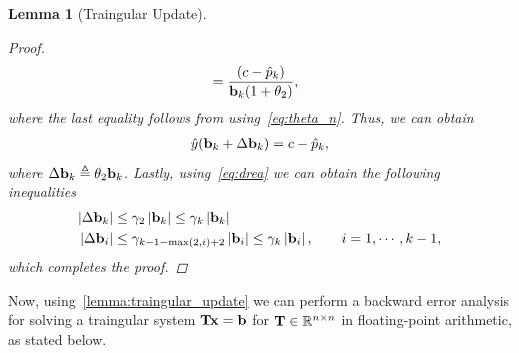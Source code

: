 \documentclass[11pt,draft]{article}
\newcommand{\define}{\ensuremath{\triangleq}}
\newcommand{\vect}[1]{\mathbf{\MakeLowercase{#1}}}
\newcommand{\mat}[1]{\mathbf{\MakeUppercase{#1}}}
\newcommand{\ireal}[1]{\in\mathbb{R}^{#1}}
\newtheorem{lemma}[theorem]{Lemma}
\theoremstyle{definition}
\theoremstyle{remark}
\newcommand{\abs}[1]{\left|#1\right|}
\begin{document}
\begin{lemma}[Traingular Update]
\begin{proof}
\begin{align}
    &=\frac{(c - \hat{p}_k)}{\vect{b}_k (1 + \theta_2)},
   \end{align}
   where the last equality follows from using~\cref{eq:theta_n}.
   Thus, we can obtain
   \begin{align}
    \hat{y}(\vect{b}_k + \Delta \vect{b}_k) = c - \hat{p}_k,
   \end{align}
   where $\Delta \vect{b}_k\define \theta_2 \vect{b}_k$.
   Lastly, using~\cref{eq:drea} we can obtain the following inequalities
   \begin{align}
    \abs{\Delta \vect{b}_k}  &\leq \gamma_2 \abs{\vect{b}_k} \leq \gamma_k\abs{\vect{b}_k}\\
    \abs{\Delta \vect{b}_i} &\leq \gamma_{k-1-\max(2,i)+2}\abs{\vect{b}_i} \leq \gamma_{k} \abs{\vect{b}_i}, \qquad  i=1,\cdots, k-1,
   \end{align}
   which completes the proof.
\end{proof}    
\end{lemma}

Now, using~\cref{lemma:traingular_update} we can perform a backward error analysis for solving a traingular system $\mat{t}\vect{x}=\vect{b}$ for $\mat{t}\ireal{n\times n}$ in floating-point arithmetic, as stated below.
\end{document}
